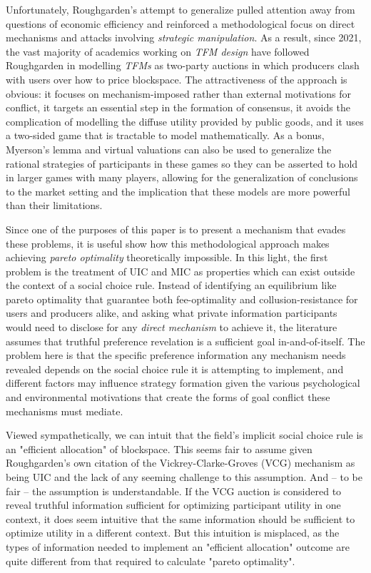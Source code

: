 Unfortunately, Roughgarden's attempt to generalize pulled attention away from questions of economic efficiency and reinforced a methodological focus on direct mechanisms and attacks involving \textit{strategic manipulation}. As a result, since 2021, the vast majority of academics working on \textit{TFM design} have followed Roughgarden in modelling \textit{TFMs} as two-party auctions in which producers clash with users over how to price blockspace. The attractiveness of the approach is obvious: it focuses on mechanism-imposed rather than external motivations for conflict, it targets an essential step in the formation of consensus, it avoids the complication of modelling the diffuse utility provided by public goods, and it uses a two-sided game that is tractable to model mathematically. As a bonus, Myerson's lemma and virtual valuations can also be used to generalize the rational strategies of participants in these games so they can be asserted to hold in larger games with many players, allowing for the generalization of conclusions to the market setting and the implication that these models are more powerful than their limitations.

Since one of the purposes of this paper is to present a mechanism that evades these problems, it is useful show how this methodological approach makes achieving \textit{pareto optimality} theoretically impossible. In this light, the first problem is the treatment of UIC and MIC as properties which can exist outside the context of a social choice rule. Instead of identifying an equilibrium like pareto optimality that guarantee both fee-optimality and collusion-resistance for users and producers alike, and asking what private information participants would need to disclose for any \textit{direct mechanism} to achieve it, the literature assumes that truthful preference revelation is a sufficient goal in-and-of-itself. The problem here is that the specific preference information any mechanism needs revealed depends on the social choice rule it is attempting to implement, and different factors may influence strategy formation given the various psychological and environmental motivations that create the forms of goal conflict these mechanisms must mediate.

Viewed sympathetically, we can intuit that the field's implicit social choice rule is an "efficient allocation" of blockspace. This seems fair to assume given Roughgarden's own citation of the Vickrey-Clarke-Groves (VCG) mechanism as being UIC and the lack of any seeming challenge to this assumption. And -- to be fair -- the assumption is understandable. If the VCG auction is considered to reveal truthful information sufficient for optimizing participant utility in one context, it does seem intuitive that the same information should be sufficient to optimize utility in a different context. But this intuition is misplaced, as the types of information needed to implement an "efficient allocation" outcome are quite different from that required to calculate "pareto optimality".

